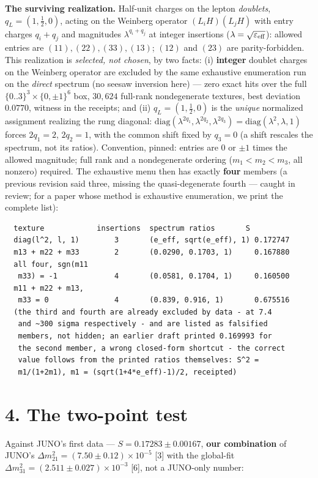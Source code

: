 \documentclass[11pt]{article}
\begin{document}
\textbf{The surviving realization.}  Half-unit charges on the lepton \emph{doublets}, $q_L = (1, \tfrac12, 0)$, acting on the Weinberg operator $(L_iH)(L_jH)$ with entry charges $q_i + q_j$ and magnitudes $\lambda^{q_i+q_j}$ at integer insertions ($\lambda = \sqrt{\varepsilon_{\rm eff}}$): allowed entries are $(11), (22), (33), (13)$; $(12)$ and $(23)$ are parity-forbidden. This realization is \emph{selected, not chosen}, by two facts: (i) \textbf{integer} doublet charges on the Weinberg operator are excluded by the same exhaustive enumeration run on the \emph{direct} spectrum (no seesaw inversion here) — zero exact hits over the full $\{0..3\}^3 \times \{0,\pm1\}^6$ box, $30{,}624$ full-rank nondegenerate textures, best deviation $0.0770$, witness in the receipts; and (ii) $q_L = (1, \tfrac12, 0)$ is the \emph{unique} normalized assignment realizing the rung diagonal: $\mathrm{diag}(\lambda^{2q_1}, \lambda^{2q_2}, \lambda^{2q_3}) = \mathrm{diag}(\lambda^2, \lambda, 1)$ forces $2q_1 = 2$, $2q_2 = 1$, with the common shift fixed by $q_3 = 0$ (a shift rescales the spectrum, not its ratios). Convention, pinned: entries are $0$ or $\pm 1$ times the allowed magnitude; full rank and a nondegenerate ordering ($m_1 < m_2 < m_3$, all nonzero) required.  The exhaustive menu then has exactly \textbf{four} members (a previous revision said three, missing the quasi-degenerate fourth — caught in review; for a paper whose method is exhaustive enumeration, we print the complete list):

\begin{small}\begin{verbatim}
  texture            insertions  spectrum ratios       S
  diag(l^2, l, 1)        3       (e_eff, sqrt(e_eff), 1) 0.172747
  m13 + m22 + m33        2       (0.0290, 0.1703, 1)     0.167880
  all four, sgn(m11
   m33) = -1             4       (0.0581, 0.1704, 1)     0.160500
  m11 + m22 + m13,
   m33 = 0               4       (0.839, 0.916, 1)       0.675516
  (the third and fourth are already excluded by data - at 7.4
   and ~300 sigma respectively - and are listed as falsified
   members, not hidden; an earlier draft printed 0.169993 for
   the second member, a wrong closed-form shortcut - the correct
   value follows from the printed ratios themselves: S^2 =
   m1/(1+2m1), m1 = (sqrt(1+4*e_eff)-1)/2, receipted)
\end{verbatim}\end{small}
\section*{4. The two-point test}
Against JUNO's first data — $S = 0.17283 \pm 0.00167$, \textbf{our combination} of JUNO's $\Delta m^2_{21} = (7.50\pm 0.12)\times 10^{-5}$ [3] with the global-fit $\Delta m^2_{31} = (2.511 \pm 0.027)\times 10^{-3}$ [6], not a JUNO-only number:
\end{document}
